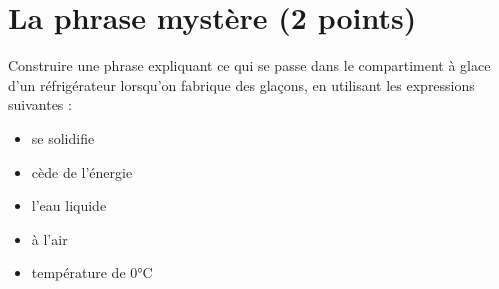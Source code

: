 \section{La phrase mystère (2 points)}

Construire une phrase expliquant ce qui se passe dans le compartiment à glace d'un réfrigérateur lorsqu'on fabrique des glaçons, en utilisant les expressions suivantes :

\begin{multicols}{2}
	\begin{itemize}
		\item se solidifie
		\item cède de l'énergie
		\item l'eau liquide
		\item à l'air
		\item température de 0°C
	\end{itemize}
\end{multicols}
